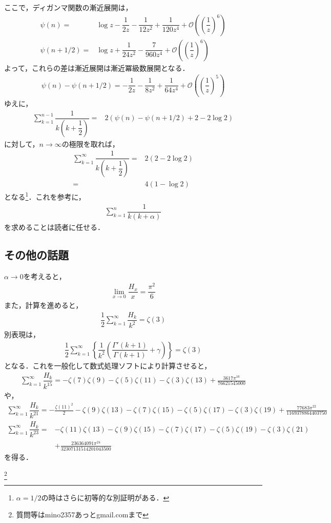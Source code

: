 \documentclass[12pt]{jsarticle}
\begin{document}
ここで，ディガンマ関数の漸近展開は，
\begin{align*}
\psi(n) =& \log z - \dfrac{1}{2z} - \dfrac{1}{12z^2} + \dfrac{1}{120z^4} + \mathcal{O}\left( \left( \dfrac{1}{z} \right)^6 \right) \\
\psi(n+1/2) =& \log z + \dfrac{1}{24z^2} - \dfrac{7}{960z^4} + \mathcal{O}\left( \left( \dfrac{1}{z} \right)^6 \right)
\end{align*}
よって，これらの差は漸近展開は漸近冪級数展開となる．
\begin{align*}
\psi(n) - \psi(n+1/2) = - \dfrac{1}{2z} - \dfrac{1}{8z^2} + \dfrac{1}{64z^4} + \mathcal{O}\left( \left( \dfrac{1}{z} \right)^5 \right)
\end{align*}
ゆえに，
\begin{align*}
\sum_{k=1}^{n-1}\dfrac{1}{k\left(k+\dfrac{1}{2}\right)} =& 2 \left( \psi(n) - \psi\left( n + 1/2 \right) + 2 - 2\log 2 \right)
\end{align*}
に対して，$n \to \infty$の極限を取れば，
\begin{align*}
\sum_{k=1}^{\infty}\dfrac{1}{k\left(k+\dfrac{1}{2}\right)} =& 2 \left( 2 - 2\log 2 \right) \\
=& 4(1 - \log 2)
\end{align*}
となる\footnote{$\alpha=1/2$の時はさらに初等的な別証明がある．}．これを参考に，
\begin{align*}
\sum_{k=1}^{n} \dfrac{1}{k(k+\alpha)}
\end{align*}
を求めることは読者に任せる．
\subsection*{その他の話題}
$\alpha \to 0$を考えると，
\begin{align*}
\lim_{x \to 0}\dfrac{H_{x}}{x} = \dfrac{\pi^2}{6}
\end{align*}
また，計算を進めると，
\begin{align*}
\dfrac{1}{2}\sum_{k=1}^{\infty}\dfrac{H_{k}}{k^2} = \zeta(3)
\end{align*}
別表現は，
\begin{align*}
\dfrac{1}{2}\sum_{k=1}^{\infty} \left\{ \dfrac{1}{k^2}\left( \dfrac{\Gamma'(k+1)}{\Gamma(k+1)} + \gamma \right) \right\} = \zeta(3)
\end{align*}
となる．これを一般化して数式処理ソフトにより計算させると，
\begin{align*}
\sum_{k=1}^{\infty}\dfrac{H_{k}}{k^{15}}=-\zeta (7) \zeta (9)-\zeta (5) \zeta (11)-\zeta (3) \zeta(13)+\frac{3617 \pi ^{16}}{76621545000}
\end{align*}
や，
\begin{align*}
\sum_{k=1}^{\infty}\dfrac{H_{k}}{k^{21}}=-\frac{\zeta (11)^2}{2}-\zeta (9) \zeta (13)-\zeta (7) \zeta (15)-\zeta (5) \zeta(17)-\zeta (3) \zeta (19)+\frac{77683 \pi ^{22}}{1169378864403750}
\end{align*}
\begin{align*}
\sum_{k=1}^{\infty}\dfrac{H_{k}}{k^{23}}=&-\zeta (11) \zeta (13)-\zeta (9) \zeta (15)-\zeta (7) \zeta (17)-\zeta (5) \zeta(19)-\zeta (3) \zeta (21) \\
&+\frac{236364091 \pi ^{24}}{32307131514201043500}
\end{align*}
を得る．

\footnote[0]{
質問等はmino2357あっとgmail.comまで
}

\thispagestyle{empty}
\end{document}
